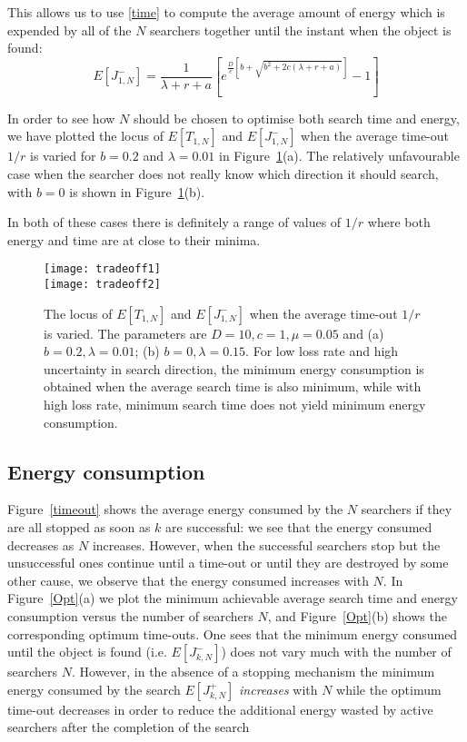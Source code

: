 \documentclass[journal]{IEEEtran}
\begin{document}
This allows us to use \eqref{time} to compute the average amount of energy which is expended by all of the $N$ searchers together until the instant when the object is found:
\begin{equation}
E[J_{1,N}^-] = \frac{1}{\lambda + r + a} [e^{\frac{D}{c}[b+\sqrt{b^2+2c(\lambda+r+a)}]}-1] \label{energy}
\end{equation}


In order to see how $N$ should be chosen to optimise both search time and energy, we have plotted the locus of $E[T_{1,N}]$ and $E[J_{1,N}^-]$ when the average time-out $1/r$ is varied for $b=0.2$ and $\lambda=0.01$ in Figure~\ref{fig-tradeoff}(a). The relatively unfavourable case when the searcher does not really know which direction it should search,
with  $b=0$ is shown in Figure~\ref{fig-tradeoff}(b).

In both of these cases there is definitely a range of values
of $1/r$ where both energy and time are at  close to their minima.


\begin{figure}[]\centering
\texttt{[image: tradeoff1]} \\\vspace{0.2in}
\texttt{[image: tradeoff2]}
\caption{The locus of $E[T_{1,N}]$ and $E[J_{1,N}^-]$ when the average time-out $1/r$ is varied. The parameters are $D = 10, c=1, \mu=0.05$ and (a) $b=0.2, \lambda=0.01$; (b) $b=0,\lambda=0.15$. For low loss rate and high uncertainty in search direction, the minimum energy consumption is obtained when the average search time is also minimum, while with high loss rate, minimum search time does not yield minimum energy consumption.}\label{fig-tradeoff}
\end{figure}

\subsection{Energy consumption}\label{energy}



Figure~\ref{timeout} shows the average energy consumed by the $N$ searchers if they are all stopped as soon as $k$ are successful: we see that the energy consumed decreases as $N$ increases. However, when the successful searchers stop but the unsuccessful ones continue until a time-out or until they are destroyed by some other cause, we observe that the energy consumed increases with $N$. In Figure~\ref{Opt}(a) we plot the minimum achievable average search time and energy consumption versus the number of searchers $N$, and Figure~\ref{Opt}(b) shows the corresponding optimum time-outs. One sees that the minimum energy consumed until the object is found (i.e. $E[J_{k,N}^-]$) does not vary much with the number of searchers $N$. However, in the absence of a stopping mechanism the minimum energy consumed by the search $E[J_{k,N}^+]$ {\em increases} with $N$ while the optimum time-out decreases in order to reduce the additional energy wasted by active searchers after the completion of the search
\end{document}
